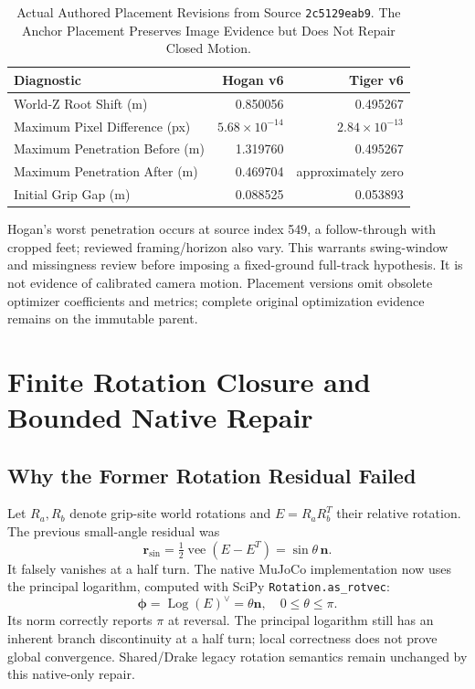 \documentclass[11pt,letterpaper]{article}
\newcommand{\code}[1]{\nolinkurl{#1}}
\newcommand{\reportsection}[1]{\section{#1}}
\begin{document}
\begin{table}[ht]\centering\small
\begin{tabular}{@{}lrr@{}}\toprule
Diagnostic & Hogan v6 & Tiger v6\\\midrule
World-Z Root Shift (m) & 0.850056 & 0.495267\\
Maximum Pixel Difference (px) & $5.68\times10^{-14}$ & $2.84\times10^{-13}$\\
Maximum Penetration Before (m) & 1.319760 & 0.495267\\
Maximum Penetration After (m) & 0.469704 & approximately zero\\
Initial Grip Gap (m) & 0.088525 & 0.053893\\\bottomrule
\end{tabular}
\caption{Actual Authored Placement Revisions from Source \code{2c5129eab9}.
The Anchor Placement Preserves Image Evidence but Does Not Repair Closed Motion.}
\end{table}

Hogan's worst penetration occurs at source index 549, a follow-through with
cropped feet; reviewed framing/horizon also vary. This warrants swing-window
and missingness review before imposing a fixed-ground full-track hypothesis.
It is not evidence of calibrated camera motion. Placement versions omit obsolete
optimizer coefficients and metrics; complete original optimization evidence
remains on the immutable parent.

\reportsection{Finite Rotation Closure and Bounded Native Repair}
\subsection{Why the Former Rotation Residual Failed}
Let $R_a,R_b$ denote grip-site world rotations and $E=R_aR_b^T$ their relative
rotation. The previous small-angle residual was
\begin{equation}
 \mathbf r_{\sin}=\tfrac12\operatorname{vee}(E-E^T)
 =\sin\theta\,\mathbf n.
\end{equation}
It falsely vanishes at a half turn. The native MuJoCo implementation now uses
the principal logarithm, computed with SciPy \code{Rotation.as_rotvec}:
\begin{equation}\boldsymbol\phi=\operatorname{Log}(E)^\vee
 =\theta\mathbf n,\quad 0\leq\theta\leq\pi.\end{equation}
Its norm correctly reports $\pi$ at reversal. The principal logarithm still
has an inherent branch discontinuity at a half turn; local correctness does
not prove global convergence. Shared/Drake legacy rotation semantics remain
unchanged by this native-only repair.
\end{document}
